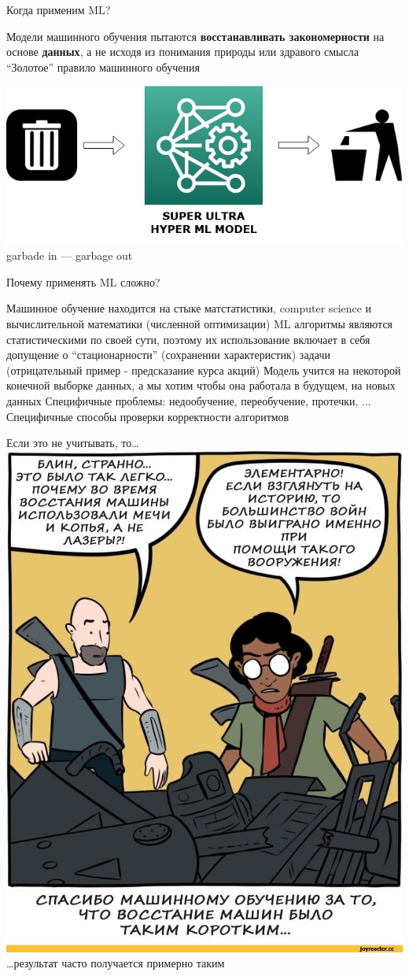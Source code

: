 \documentclass[aspectratio=169, professionalfonts]{beamer}
\begin{document}
\begin{frame}{Когда применим ML?}
    \begin{outline}
        \1 Модели машинного обучения пытаются \textbf{восстанавливать закономерности} на
        основе \textbf{данных}, а не исходя из понимания природы или здравого смысла
        \1 ``Золотое'' правило машинного обучения
    \end{outline}
    \begin{center}
        \includegraphics[width=.49\linewidth]{figures/fig42-golden-rule.jpg} \\
        garbade in --- garbage out
    \end{center}
\end{frame}

\begin{frame}{Почему применять ML сложно?}
    \begin{outline}
        \1 Машинное обучение находится на стыке матстатистики, computer science и
        вычислительной математики (численной оптимизации)
        \pause
        \1 ML алгоритмы являются статистическими по своей сути, поэтому их использование
        включает в себя допущение о ``стационарности'' (сохранении характеристик)
        задачи (отрицательный пример - предсказание курса акций)
        \pause
        \1 Модель учится на некоторой конечной выборке данных, а мы хотим чтобы она
        работала в будущем, на новых данных
        \pause
        \1 Специфичные проблемы: недообучение, переобучение, протечки, ...
        \1 Специфичные способы проверки корректности алгоритмов
    \end{outline}
\end{frame}

\begin{frame}{Если это не учитывать, то\ldots}
    \centering
    \includegraphics[width=.345\linewidth]{figures/fig43-ml-fuckup.jpg} \\
    \ldots результат часто получается примерно таким
\end{frame}
\end{document}
